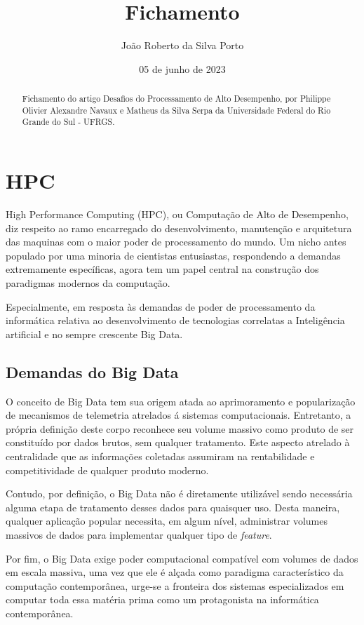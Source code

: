 \documentclass{article}
\begin{document}
      
\title{Fichamento}
\date{05 de junho de 2023}
\author{João Roberto da Silva Porto}

\begin{abstract}
\noindent
Fichamento do artigo Desafios do Processamento de Alto Desempenho, 
por Philippe Olivier Alexandre Navaux e Matheus da Silva Serpa da Universidade Federal do Rio Grande
do Sul - UFRGS.
\end{abstract}

\section*{HPC}
High Performance Computing (HPC), ou Computação de Alto de Desempenho, diz respeito ao ramo encarregado do desenvolvimento, manutenção e arquitetura das maquinas com o maior poder de processamento do mundo. Um nicho antes populado por uma minoria de cientistas entusiastas, respondendo a demandas extremamente específicas, agora tem um papel central na construção dos paradigmas modernos da computação.

Especialmente, em resposta às demandas de poder de processamento da informática relativa ao desenvolvimento de tecnologias correlatas a Inteligência artificial e no sempre crescente Big Data.

\subsection*{Demandas do Big Data}
O conceito de Big Data tem sua origem atada ao aprimoramento e popularização de mecanismos de telemetria atrelados á sistemas computacionais. Entretanto, a própria definição deste corpo reconhece seu volume massivo como produto de ser constituído por dados brutos, sem qualquer tratamento. Este aspecto atrelado à centralidade que as informações coletadas assumiram na rentabilidade e competitividade de qualquer produto moderno.

Contudo, por definição, o Big Data não é diretamente utilizável sendo necessária alguma etapa de tratamento desses dados para quaisquer uso. Desta maneira, qualquer aplicação popular necessita, em algum nível, administrar volumes massivos de dados para implementar qualquer tipo de \emph{feature}.

Por fim, o Big Data exige poder computacional compatível com volumes de dados em escala massiva, uma vez que ele é alçada como paradigma característico da computação contemporânea, urge-se a fronteira dos sistemas especializados em computar toda essa matéria prima como um protagonista na informática contemporânea.    
\end{document}

